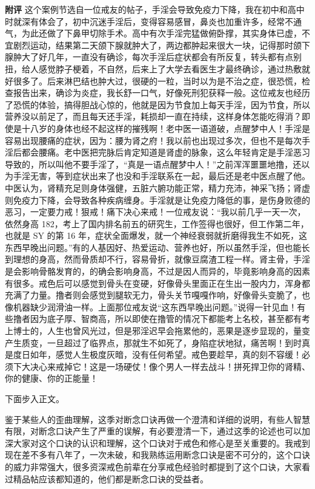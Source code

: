 \begin{case}
    \textbf{附评} 这个案例节选自一位戒友的帖子，手淫会导致免疫力下降，我在初中和高中时就深有体会了，初中沉迷手淫后，变得容易感冒，鼻炎也加重许多，经常不通气，为此还做了下鼻甲切除手术。高中有次手淫完猛做俯卧撑，其实身体已虚，不宜剧烈运动，结果第二天颌下腺就肿大了，两边都肿起来很大一块，记得那时颌下腺肿大了好几年，一直没有确诊，每次手淫后症状都会有所反复，转头都有点别扭，给人感觉脖子梗着，不自然，后来上了大学去看医生才最终确诊，通过热敷就好很多了。后来淋巴结也肿大过，很硬的一粒，当时以为是不治之症，很恐慌，检查报告出来，确诊为炎症，我长舒一口气，好像死刑犯获释一般。这位戒友也经历了恐慌的体验，搞得胆战心惊的，他就是因为节食加上每天手淫，因为节食，所以营养没以前足了，而且每天还手淫，耗损却一直在持续，这样身体怎能吃得消？即使是十八岁的身体也经不起这样的摧残啊！老中医一语道破，点醒梦中人！手淫是容易出现腰痛的症状，因为：腰为肾之府！我以前也出现过多次，但也不是每次手淫后都会腰痛。老中医把完脉后肯定知道是肾虚的脉象，这么年轻肯定是手淫恶习导致的，所以叫他不要手淫了，“真是一语点醒梦中人！”之前浑浑噩噩地撸，还以为手淫无害，等到症状出来了也没和手淫联系在一起，最后还是老中医点醒了他。中医认为，肾精充足则身体强健，五脏六腑功能正常，精力充沛，神采飞扬；肾虚则免疫力下降，会导致各种疾病缠身。手淫就是让免疫力降低的事，是伤身败德的恶习，一定要力戒！狠戒！痛下决心来戒！一位戒友说：“我以前几乎一天一次，依然身高 182，考上了国内排名前五的研究生，工作签得也很好，但工作第二年，也就是 SY 的第 16 年，症状全面爆发，就一个神经衰弱就折磨得我生不如死，这东西早晚出问题。”有的人基因好、热爱运动、营养也好，所以虽然手淫，但也能长到理想的身高，然而骨质却不行，容易骨折，就像豆腐渣工程一样。肾主骨，手淫是会影响骨骼发育的，的确会影响身高，不过是因人而异的，毕竟影响身高的因素有很多。戒色后可以感觉到骨头在变硬，好像骨头里面正在生出一股内力，浑身都充满了力量。撸者则会感觉到腿软无力，骨头关节嘎嘎作响，好像骨头变脆了，也像机器缺少润滑油一样。上面那位戒友说“这东西早晚出问题。”说得一针见血！有些撸者因为底子厚、智商高，所以即使在撸管的情况下都能考上名校，甚至都有考上博士的，人生也曾风光过，但是邪淫迟早会拖累他的，恶果是逐步显现的，量变产生质变，一旦超过了临界点，那就生不如死了，身陷症状地狱，痛苦啊！到时真是度日如年，感觉人生极度灰暗，没有任何希望。戒色要趁早，真的刻不容缓！必须下大决心来戒掉它！这是一场硬仗！像个男人一样去战斗！拼死捍卫你的肾精、你的健康、你的正能量！
\end{case}

下面步入正文。

鉴于某些人的歪曲理解，这季对断念口诀再做一个澄清和详细的说明，有些人智慧有限，对断念口诀产生了严重的误解，有必要澄清一下，通过这季的论述也可以加深大家对这个口诀的认识和理解，这个口诀对于戒色和修心是至关重要的。我戒到现在差不多有八年了，一次未破，和我熟练运用断念口诀是密不可分的，这个口诀的威力非常强大，很多资深戒色前辈在分享戒色经验时都提到了这个口诀，大家看过精品帖应该都知道的，他们都是断念口诀的受益者。


